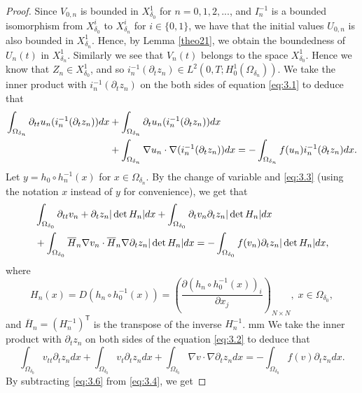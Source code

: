 \documentclass[10pt,a4paper]{amsart}
\begin{document}
\begin{proof}
Since $V_{0,n} $ is bounded in $X^1_{\delta_0}$ for $n=0,1,2,...$, and $I_n^{-1} $ is a bounded isomorphism from $X_{\delta_0}^i$ to $X_{\delta_n}^i$ for $i\in \{0,1\}$, we have that the initial values $U_{0,n}$ is also bounded in $X_{\delta_n}^1$. Hence, by Lemma \ref{theo21}, we obtain the boundedness of $U_n(t)$ in $X_{\delta_n}^1$. Similarly we see that $V_n(t)$ belongs to the space $X_{\delta_0}^1$. Hence we know that $Z_n \in X_{\delta_0}^1$, and so $i_n^{-1}(\partial_t z_n) \in L^2(0,T;H_0^1(\Omega_{\delta_n}))$. We take the inner product with $i_n^{-1}(\partial_t z_n)$ on the both sides of equation \eqref{eq:3.1} to deduce that
\begin{align}\label{eq:3.3}
\int_{\Omega_{\delta_n}}\partial_{tt}u_n (i_n^{-1}(\partial_t z_n)) dx &+ \int_{\Omega_{\delta_n}}\partial_tu_n (i_n^{-1}(\partial_t z_n)) dx \notag\\
&+\int_{\Omega_{\delta_n}}\nabla u_n \cdot \nabla (i_n^{-1}(\partial_tz_n))dx 
=-\int_{\Omega_{\delta_n}}f(u_n) i_n^{-1}(\partial_t z_n) dx.
\end{align}
Let $y = h_0 \circ h_n^{-1}(x)$ for $x \in \Omega_{\delta_n}$. By the change of variable and \eqref{eq:3.3} (using the notation $x$ instead of $y$ for convenience), we get  that
\begin{align} \label{eq:3.4}
&\int_{\Omega_{\delta_0}}\partial_{tt}v_n + \partial_t z_n|\det H_n|dx+ \int_{\Omega_{\delta_0}}\partial_{t}v_n  \partial_t z_n|\det H_n|dx\notag \\
&+\int_{\Omega_{\delta_0}}\overline{H}_n\nabla v_n \cdot \overline{H}_n\nabla \partial_t z_n |\det H_n| dx =-\int_{\Omega_{\delta_0}} f(v_n) \partial_t z_n|\det H_n| dx,
\end{align}
where
\begin{equation*}\label{eq:3.5}
H_n(x)=D(h_n\circ h_0^{-1}(x))=\left(\dfrac{\partial (h_n\circ h_0^{-1}(x))_i}{\partial x_j}\right)_{N\times N}, \; x\in \Omega_{\delta_0},
\end{equation*}
and $\overline{H}_n=(H_n^{-1})^{\mathsf{T}}$ is the transpose of the inverse $H_n^{-1}$.
 mm
We take the inner product with $\partial_t z_n$ on both sides of the equation \eqref{eq:3.2} to deduce that
\begin{equation}\label{eq:3.6}
\int_{\Omega_{\delta_0}}v_{tt}\partial_t z_n dx+\int_{\Omega_{\delta_0}}v_t \partial_t z_n dx+ \int_{\Omega_{\delta_0}}\nabla v\cdot \nabla \partial_t z_ndx=-\int_{\Omega_{\delta_0}}f(v) \partial_t z_ndx.\end{equation}
By subtracting \eqref{eq:3.6} from \eqref{eq:3.4}, we get

\end{proof}
\end{document}
